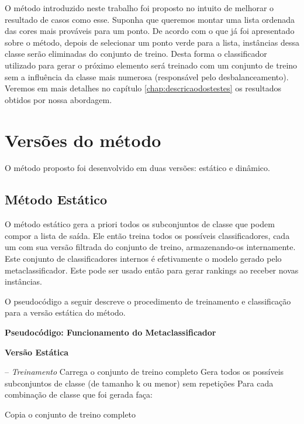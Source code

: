O método introduzido neste trabalho foi proposto no intuito de melhorar o resultado de casos como esse.
Suponha que queremos montar uma lista ordenada das cores mais prováveis para um ponto.
De acordo com o que já foi apresentado sobre o método, depois de selecionar um ponto verde para a lista, instâncias dessa classe serão eliminadas do conjunto de treino.
Desta forma o classificador utilizado para gerar o próximo elemento será treinado com um conjunto de treino sem a influência da classe mais numerosa (responsável pelo desbalanceamento).
Veremos em mais detalhes no capítulo \ref{chap:descricaodostestes} os resultados obtidos por nossa abordagem.

\section{Versões do método}
\label{sec:versoesdometodo}

O método proposto foi desenvolvido em duas versões: estático e dinâmico.


\subsection{Método Estático}

O método estático gera a priori todos os subconjuntos de classe que podem compor a lista de saída. 
Ele então treina todos os possíveis classificadores, cada um com sua versão filtrada do conjunto de treino, armazenando-os internamente.
Este conjunto de classificadores internos é efetivamente o modelo gerado pelo metaclassificador. 
Este pode ser usado então para gerar rankings ao receber novas instâncias. 

O pseudocódigo a seguir descreve o procedimento de treinamento e classificação para a versão estática do método.
\\

\begin{center}
\textbf{Pseudocódigo: Funcionamento do Metaclassificador}

\textbf{Versão Estática}
\end{center}
\hfill \break
-- \textit{Treinamento}\newline
Carrega o conjunto de treino completo\newline
Gera todos os possíveis subconjuntos de classe (de tamanho k ou menor) sem repetições\newline
Para cada combinação de classe que foi gerada faça:

\quad Copia o conjunto de treino completo

